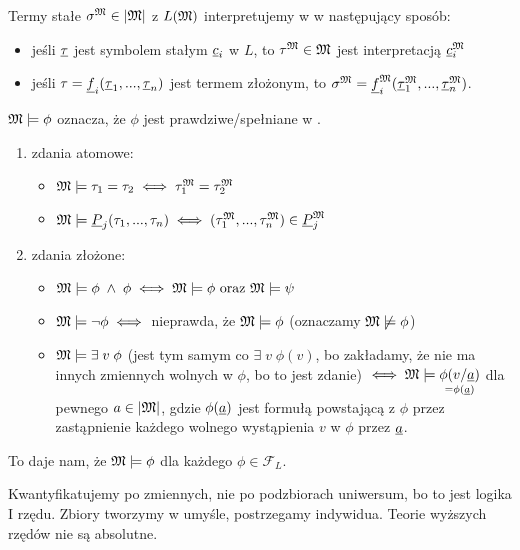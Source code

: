 Termy stałe $\sigma^{\mathfrak{M}}\in |\mathfrak{M}|$ z $L(\mathfrak{M})$ interpretujemy w \Mm{} w następujący sposób:
\begin{itemize}
  \item jeśli $\underline{\tau}$ jest symbolem stałym $\underline{c}_i$ w $L$, to $\tau^{\mathfrak{M}}\in\mathfrak{M}$ jest interpretacją $\underline{c}_i^{\mathfrak{M}}$
  \item jeśli $\tau=\underline{f}_i(\underline{\tau}_1,...,\underline{\tau}_n)$ jest termem złożonym, to $\sigma^{\mathfrak{M}}=\underline{f}_i^{\mathfrak{M}}(\underline{\tau}_1^{\mathfrak{M}},...,\underline{\tau}_n^{\mathfrak{M}})$. 
\end{itemize}

\begin{konwencja}{}{}
  $\mathfrak{M}\models\phi$ oznacza, że $\phi$ jest prawdziwe/spełniane w \Mm.
\end{konwencja}

\begin{enumerate}[label=\alph*)]
  \item zdania atomowe:
    \begin{itemize}
      \item $\mathfrak{M}\models \tau_1=\tau_2\iff\tau_1^{\mathfrak{M}}=\tau_2^{\mathfrak{M}}$
      \item $\mathfrak{M}\models \underline{P}_j(\tau_1,..., \tau_n)\iff (\tau_1^{\mathfrak{M}},...,\tau_n^{\mathfrak{M}})\in\underline{P}_j^{\mathfrak{M}}$
    \end{itemize}
  \item zdania złożone:
    \begin{itemize}
      \item $\mathfrak{M}\models\phi\;\land\;\phi\iff\mathfrak{M}\models\phi\text{ oraz }\mathfrak{M}\models\psi$
      \item $\mathfrak{M}\models\neg\phi\iff $ nieprawda, że $\mathfrak{M}\models \phi$ (oznaczamy $\mathfrak{M}\not\models\phi$)
      \item $\mathfrak{M}\models\exists\;v\;\phi$ (jest tym samym co $\exists\;v\;\phi(v)$, bo zakładamy, że nie ma innych zmiennych wolnych w $\phi$, bo to jest zdanie) $\iff \mathfrak{M}\models\underset{=\phi(\underline{a})}{\phi(v/\underline{a})}$ dla pewnego $a\in|\mathfrak{M}|$, gdzie $\phi(\underline{a})$ jest formułą powstającą z $\phi$ przez zastąpnienie każdego wolnego wystąpienia $v$ w $\phi$ przez $\underline{a}$.
    \end{itemize}
\end{enumerate}

To daje nam, że $\mathfrak{M}\models\phi$ dla każdego $\phi\in\mathcal{F}_L$.

Kwantyfikatujemy po zmiennych, nie po podzbiorach uniwersum, bo to jest logika I rzędu. Zbiory tworzymy w umyśle, postrzegamy indywidua. Teorie wyższych rzędów nie są absolutne.


